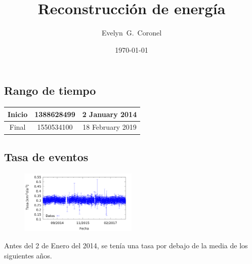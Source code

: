



\title{Reconstrucción de energía}
\author{Evelyn~G.~Coronel}


\date[]{\lowercase{\today}} %


\maketitle


\subsection{Rango de tiempo}
\begin{table}[H]
\centering
\begin{tabular}{c|c|c}
Inicio & 1388628499 & 2 January 2014 \\ \hline
Final  & 1550534100 & 18 February 2019 \\
\end{tabular}
\end{table}

\subsection{Tasa de eventos}

\begin{figure}[H]
	\centering
	\includegraphics[width=0.5\textwidth]{rate_1_EeV.png}
\end{figure}

Antes del 2 de Enero del 2014, se tenía una tasa por debajo de la media de los siguientes años.


